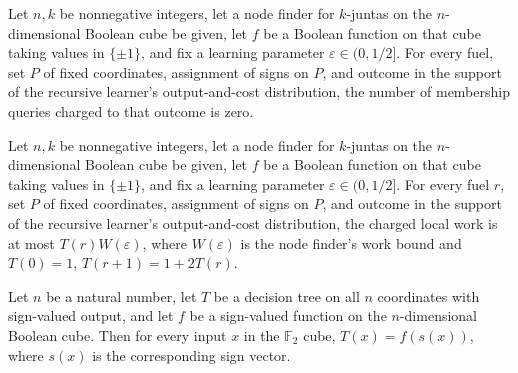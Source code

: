\begin{theorem}
\label{FABL.recursiveJuntaLearnerAux_queries_eq_zero}
\leanok
{}
Let $n,k$ be nonnegative integers, let a node finder for $k$-juntas on the
$n$-dimensional Boolean cube be given, let $f$ be a Boolean function on that cube taking
values in $\{\pm1\}$, and fix a learning parameter $\varepsilon\in(0,1/2]$. For every
fuel, set $P$ of fixed coordinates, assignment of signs on $P$, and outcome in the
support of the recursive learner's output-and-cost distribution, the number of
membership queries charged to that outcome is zero.
\end{theorem}

\begin{theorem}
\label{FABL.recursiveJuntaLearnerAux_work_le}
\leanok
{}
Let $n,k$ be nonnegative integers, let a node finder for $k$-juntas on the
$n$-dimensional Boolean cube be given, let $f$ be a Boolean function on that cube taking
values in $\{\pm1\}$, and fix a learning parameter $\varepsilon\in(0,1/2]$. For every
fuel $r$, set $P$ of fixed coordinates, assignment of signs on $P$, and outcome in the
support of the recursive learner's output-and-cost distribution, the charged local work
is at most $T(r)W(\varepsilon)$, where $W(\varepsilon)$ is the node finder's work bound
and $T(0)=1$, $T(r+1)=1+2T(r)$.
\end{theorem}

\begin{definition}
\label{FABL.DecisionTreeComputesTarget}
\leanok
{}
Let $n$ be a natural number, let $T$ be a decision tree on all $n$ coordinates with
sign-valued output, and let $f$ be a sign-valued function on the $n$-dimensional Boolean
cube. Then for every input $x$ in the $\mathbb{F}_2$ cube, $T(x)=f(s(x))$, where $s(x)$ is the
corresponding sign vector.
\end{definition}

